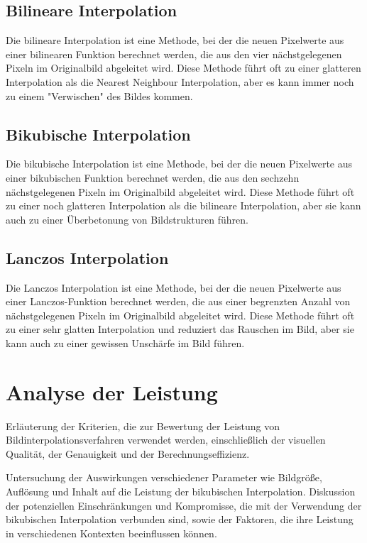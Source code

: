 \subsection{Bilineare Interpolation}

Die bilineare Interpolation ist eine Methode, bei der die neuen Pixelwerte aus einer bilinearen Funktion berechnet werden, die aus den vier nächstgelegenen Pixeln im Originalbild abgeleitet wird. 
Diese Methode führt oft zu einer glatteren Interpolation als die Nearest Neighbour Interpolation, aber es kann immer noch zu einem "Verwischen" des Bildes kommen.

\subsection{Bikubische Interpolation}

Die bikubische Interpolation ist eine Methode, bei der die neuen Pixelwerte aus einer bikubischen Funktion berechnet werden, die aus den sechzehn nächstgelegenen Pixeln im Originalbild abgeleitet wird.
Diese Methode führt oft zu einer noch glatteren Interpolation als die bilineare Interpolation, aber sie kann auch zu einer Überbetonung von Bildstrukturen führen.

\subsection{Lanczos Interpolation}
Die Lanczos Interpolation ist eine Methode, bei der die neuen Pixelwerte aus einer Lanczos-Funktion berechnet werden, die aus einer begrenzten Anzahl von nächstgelegenen Pixeln im Originalbild abgeleitet wird. 
Diese Methode führt oft zu einer sehr glatten Interpolation und reduziert das Rauschen im Bild, aber sie kann auch zu einer gewissen Unschärfe im Bild führen.

\section{Analyse der Leistung}

    Erläuterung der Kriterien, die zur Bewertung der Leistung von Bildinterpolationsverfahren verwendet werden, einschließlich der visuellen Qualität, der Genauigkeit und der Berechnungseffizienz.

    Untersuchung der Auswirkungen verschiedener Parameter wie Bildgröße, Auflösung und Inhalt auf die Leistung der bikubischen Interpolation.
    Diskussion der potenziellen Einschränkungen und Kompromisse, die mit der Verwendung der bikubischen Interpolation verbunden sind, sowie der Faktoren, die ihre Leistung in verschiedenen Kontexten beeinflussen können.

